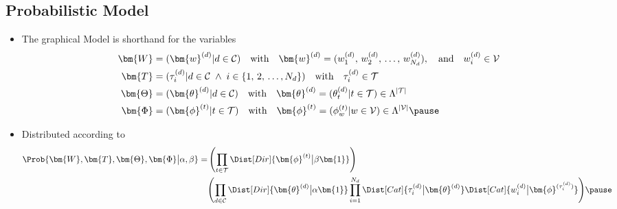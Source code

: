 \begin{slide}
\section[-2]{Probabilistic Model}

\begin{PauseHighLight}
  \begin{itemize}
\item The graphical Model is shorthand for the variables
 {\small \begin{align*}
    \bm{W} &= (\bm{w}^{(d)} | d\in\mathcal{C})\quad \text{with} \quad
    \bm{w}^{(d)}=(w_1^{(d)},\, w_2^{(d)},\, \ldots,\, w_{N_d}^{(d)}),
    \quad \text{and}\quad w_i^{(d)} \in \mathcal{V} \\
    \bm{T} &= (\tau^{(d)}_i | d\in\mathcal{C}\;\wedge\;
    i\in\{1,\,2,\,\ldots, N_d\})\quad \text{with} \quad \tau^{(d)}_i \in
    \mathcal{T} \\
    \bm{\Theta} &=(\bm{\theta}^{(d)} | d\in\mathcal{C})\quad \text{with}
    \quad \bm{\theta}^{(d)} = (\theta^{(d)}_t | t \in \mathcal{T})\in
    \Lambda^{|\mathcal{T}|} \\
    \bm{\Phi} &= (\bm{\phi}^{(t)} | t \in \mathcal{T}) \quad \text{with}
    \quad \bm{\phi}^{(t)} = (\phi^{(t)}_w | w \in \mathcal{V}) \in
    \Lambda^{|\mathcal{V}|}\pause
  \end{align*}}
\item Distributed according to
  {\small\begin{align*}
    \Prob{\bm{W},\bm{T},\bm{\Theta},\bm{\Phi}\big|\alpha,\beta} =
    & \left(\prod_{t\in\mathcal{T}} \Dist[Dir]{\bm{\phi}^{(t)}\big|\beta\bm{1}}\right)
    \\ & \Biggl(\prod_{d\in\mathcal{C}} \Dist[Dir]{\bm{\theta}^{(d)}\big|\alpha\bm{1}}
     \prod_{i=1}^{N_d} \Dist[Cat]{\tau_i^{(d)}\big| \bm{\theta}^{(d)}}
    \Dist[Cat]{w_i^{(d)} \big| \bm{\phi}^{(\tau_i^{(d)})}}\Biggr)\pause
  \end{align*}}

\end{itemize}
\end{PauseHighLight}

\end{slide}


